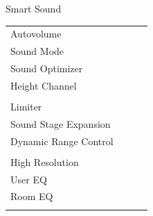 \documentclass{beamer}
\begin{document}
\begin{frame}[t]{Smart Sound}
\begin{tiny}
\begin{tabular}{@{}lccc@{}}
				Autovolume & \color{black}{Off} & & \\
				Sound Mode & \color{black}{Off} & & \\
				Sound Optimizer & \color{black}{Off} & & \\
				Height Channel & \color{black}{Off} & & \\
				\color{blue}{Automatic Scene Classificiation} & \color{blue}{On} & & \\
				Limiter & \color{black}{Off} & & \\
				Sound Stage Expansion & \color{blue}{On} & & \\
				Dynamic Range Control & \color{black}{Off} & & \\
				\color{blue}{Smart Sound Controller} & \color{blue}{On} & & \\
				High Resolution & \color{black}{Off} & & \\
				User EQ & \color{black}{Off} & & \\
				Room EQ & \color{black}{Off} & & \\
				\color{blue}{OSD Volume} & \color{blue}{On} &  \color{blue}{Vol.40} & \\
				\midrule
			\end{tabular}
		\end{tiny}
		
	\end{frame}
	
\end{document}
